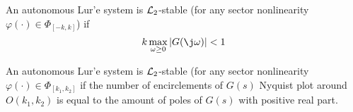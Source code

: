 \begin{theorem}
	An autonomous Lur'e system is $\mathcal{L}_2$-stable (for any sector nonlinearity $\varphi(\cdot) \in \Phi_{[-k, k]}$) if
	\[k \max_{\omega \ge 0}{\abs{G(\j \omega)}} < 1\]
\end{theorem}

\begin{theorem}
	An autonomous Lur'e system is $\mathcal{L}_2$-stable (for any sector nonlinearity $\varphi(\cdot) \in \Phi_{[k_1, k_2]}$ if the number of encirclements of $G(s)$ Nyquist plot around $O(k_1,k_2)$ is equal to the amount of poles of $G(s)$ with positive real part.
\end{theorem}
